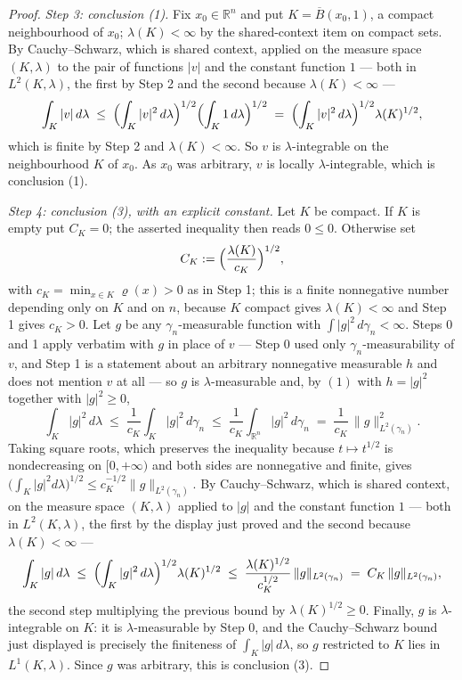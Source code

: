 \begin{proof}
\emph{Step 3: conclusion (1).}
Fix $x_0 \in \mathbb{R}^n$ and put $K = \overline{B}(x_0,1)$, a compact
neighbourhood of $x_0$; $\lambda(K) < \infty$ by the shared-context item on
compact sets.  By Cauchy--Schwarz, which is shared context, applied on the
measure space $(K,\lambda)$ to the pair of functions $|v|$ and the constant
function $1$ --- both in $L^2(K,\lambda)$, the first by Step 2 and the second
because $\lambda(K) < \infty$ ---
\[
  \int_K |v| \, d\lambda
    \;\leq\; \Bigl(\int_K |v|^2 \, d\lambda\Bigr)^{1/2}
             \Bigl(\int_K 1 \, d\lambda\Bigr)^{1/2}
    \;=\; \Bigl(\int_K |v|^2 \, d\lambda\Bigr)^{1/2} \lambda(K)^{1/2} ,
\]
which is finite by Step 2 and $\lambda(K) < \infty$.  So $v$ is
$\lambda$-integrable on the neighbourhood $K$ of $x_0$.  As $x_0$ was arbitrary,
$v$ is locally $\lambda$-integrable, which is conclusion (1).

\emph{Step 4: conclusion (3), with an explicit constant.}
Let $K$ be compact.  If $K$ is empty put $C_K = 0$; the asserted inequality then
reads $0 \leq 0$.  Otherwise set
\[
  C_K := \Bigl(\frac{\lambda(K)}{c_K}\Bigr)^{1/2},
\]
with $c_K = \min_{x\in K}\varrho(x) > 0$ as in Step 1; this is a finite
nonnegative number depending only on $K$ and on $n$, because $K$ compact gives
$\lambda(K) < \infty$ and Step 1 gives $c_K > 0$.  Let $g$ be any
$\gamma_n$-measurable function with $\int |g|^2 \, d\gamma_n < \infty$.  Steps 0
and 1 apply verbatim with $g$ in place of $v$ --- Step 0 used only
$\gamma_n$-measurability of $v$, and Step 1 is a statement about an arbitrary
nonnegative measurable $h$ and does not mention $v$ at all --- so $g$ is
$\lambda$-measurable and, by $(1)$ with $h = |g|^2$ together with
$|g|^2 \geq 0$,
\[
  \int_K |g|^2 \, d\lambda
    \;\leq\; \frac{1}{c_K}\int_K |g|^2\, d\gamma_n
    \;\leq\; \frac{1}{c_K}\int_{\mathbb{R}^n} |g|^2\, d\gamma_n
    \;=\; \frac{1}{c_K}\,\|g\|_{L^2(\gamma_n)}^2 .
\]
Taking square roots, which preserves the inequality because $t \mapsto t^{1/2}$
is nondecreasing on $[0,+\infty)$ and both sides are nonnegative and finite,
gives $\bigl(\int_K|g|^2 d\lambda\bigr)^{1/2} \leq c_K^{-1/2}
\|g\|_{L^2(\gamma_n)}$.  By Cauchy--Schwarz, which is shared context, on the
measure space $(K,\lambda)$ applied to $|g|$ and the constant function $1$ ---
both in $L^2(K,\lambda)$, the first by the display just proved and the second
because $\lambda(K) < \infty$ ---
\[
  \int_K |g| \, d\lambda
    \;\leq\; \Bigl(\int_K |g|^2 \, d\lambda\Bigr)^{1/2} \lambda(K)^{1/2}
    \;\leq\; \frac{\lambda(K)^{1/2}}{c_K^{1/2}}\,\|g\|_{L^2(\gamma_n)}
    \;=\; C_K\, \|g\|_{L^2(\gamma_n)} ,
\]
the second step multiplying the previous bound by $\lambda(K)^{1/2} \geq 0$.
Finally, $g$ is $\lambda$-integrable on $K$: it is $\lambda$-measurable by Step 0,
and the Cauchy--Schwarz bound just displayed is precisely the finiteness of
$\int_K |g|\, d\lambda$, so $g$ restricted to $K$ lies in $L^1(K,\lambda)$.
Since $g$ was arbitrary, this is conclusion (3).
\end{proof}
